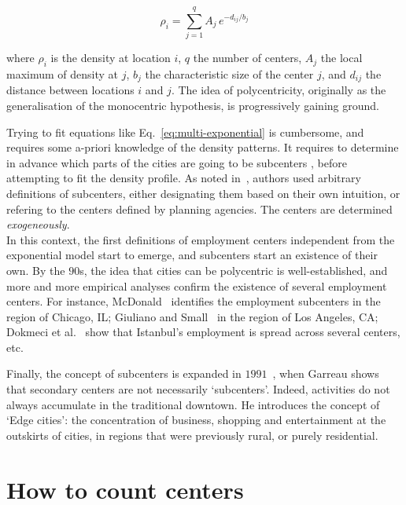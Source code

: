 \begin{equation}
    \rho_i = \sum_{j=1}^{q} A_j\,e^{-d_{ij}/b_j}
    \label{eq:multi-exponential}
\end{equation}

where $\rho_i$ is the density at location $i$, $q$ the number of centers, $A_j$
the local maximum of density at $j$, $b_j$ the characteristic size of the center
$j$, and $d_{ij}$ the distance between locations $i$ and $j$. The idea of
polycentricity, originally as the generalisation of the monocentric hypothesis,
is progressively gaining ground. 

Trying to fit equations like Eq.~\ref{eq:multi-exponential} is cumbersome, and
requires some a-priori knowledge of the density patterns. It requires to
determine in advance which parts of the cities are going to be subcenters
,
before attempting to fit the density profile. As noted in~\cite{Giuliano:1991},
authors used arbitrary definitions of subcenters, either designating them based
on their own intuition, or refering to the centers defined by planning agencies.
The centers are determined \emph{exogeneously}.
\\

In this context, the first definitions of employment centers independent from
the exponential model start to emerge, and subcenters start an existence of
their own. By the $90$s, the idea that cities can be polycentric is
well-established, and more and more empirical analyses confirm the existence of
several employment centers. For instance, McDonald~\cite{McDonald:1987} identifies the
employment subcenters in the region of Chicago, IL; Giuliano and Small~\cite{Giuliano:1991} in the
region of Los Angeles, CA; Dokmeci et al.~\cite{Dokmeci:1994} show that Istanbul's employment
is spread across several centers, etc. 

Finally, the concept of subcenters is expanded in $1991$~\cite{Garreau:1991},
when Garreau shows that secondary centers are not necessarily `subcenters'.
Indeed, activities do not always accumulate in the traditional downtown. He
introduces the concept of `Edge cities': the concentration of business, shopping
and entertainment at the outskirts of cities, in regions that were previously
rural, or purely residential.\\


\section{How to count centers}
\label{sec:how_to_measure_polycentrity}

